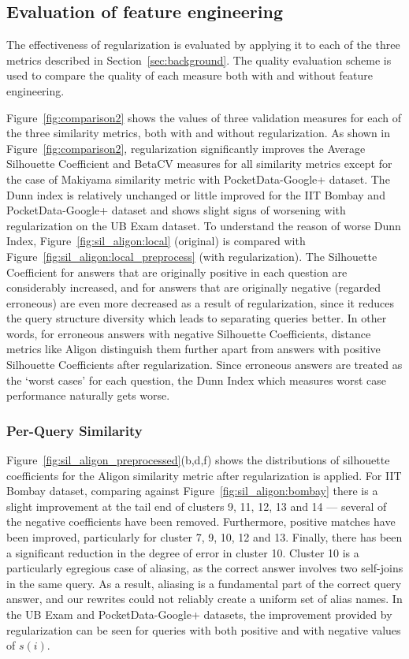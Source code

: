 \subsection{Evaluation of feature engineering}
\label{subsec:evaluation}
The effectiveness of regularization is evaluated by applying it to each of the three metrics described in Section~\ref{sec:background}.
The quality evaluation scheme is used to compare the quality of each measure both with and without feature engineering.

Figure~\ref{fig:comparison2} shows the values of three validation measures for each of the three similarity metrics, both with and without regularization.
As shown in Figure~\ref{fig:comparison2}, regularization significantly improves the Average Silhouette Coefficient and BetaCV measures for all similarity metrics except for the case of Makiyama similarity metric with PocketData-Google+ dataset.
The Dunn index is relatively unchanged or little improved for the IIT Bombay and PocketData-Google+ dataset and shows slight signs of worsening with regularization on the UB Exam dataset. To understand the reason of worse Dunn Index, Figure~\ref{fig:sil_aligon:local} (original) is compared with Figure~\ref{fig:sil_aligon:local_preprocess} (with regularization). 
The Silhouette Coefficient for answers that are originally positive in each question are considerably increased, and for answers that are originally negative (regarded erroneous) are even more decreased as a result of regularization, since it reduces the query structure diversity which leads to separating queries better.
In other words, for erroneous answers with negative Silhouette Coefficients, distance metrics like Aligon distinguish them further apart from answers with positive Silhouette Coefficients after regularization. 
Since erroneous answers are treated as the `worst cases' for each question, the Dunn Index which measures worst case performance naturally gets worse.

\subsubsection{Per-Query Similarity}
Figure~\ref{fig:sil_aligon_preprocessed}(b,d,f) shows the distributions of silhouette coefficients for the Aligon similarity metric after regularization is applied.  
For IIT Bombay dataset, comparing against Figure~\ref{fig:sil_aligon:bombay} there is a slight improvement at the tail end of clusters 9, 11, 12, 13 and 14 --- several of the negative coefficients have been removed.  
Furthermore, positive matches have been improved, particularly for cluster 7, 9, 10, 12 and 13.  
Finally, there has been a significant reduction in the degree of error in cluster 10.  
Cluster 10 is a particularly egregious case of aliasing, as the correct answer involves two self-joins in the same query.
As a result, aliasing is a fundamental part of the correct query answer, and our rewrites could not reliably create a uniform set of alias names.
In the UB Exam and PocketData-Google+ datasets, the improvement provided by regularization can be seen for queries with both positive and with negative values of $s(i)$.


